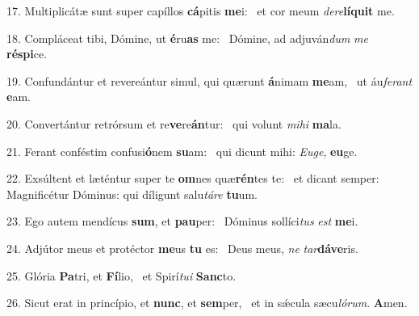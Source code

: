 17. Multiplicátæ sunt super capíllos \textbf{cá}pitis \textbf{me}i: \ast\  et cor meum \textit{de}\textit{re}\textbf{lí}\textbf{quit} me.\

18. Compláceat tibi, Dómine, ut \textbf{é}ru\textbf{as} me: \ast\  Dómine, ad adjuván\textit{dum} \textit{me} \textbf{ré}\textbf{spi}ce.\

19. Confundántur et revereántur simul, qui quærunt \textbf{á}nimam \textbf{me}am, \ast\  ut áu\textit{fe}\textit{rant} \textbf{e}am.\

20. Convertántur retrórsum et re\textbf{ve}re\textbf{án}tur: \ast\  qui volunt \textit{mi}\textit{hi} \textbf{ma}la.\

21. Ferant conféstim confusi\textbf{ó}nem \textbf{su}am: \ast\  qui dicunt mihi: \textit{Eu}\textit{ge}, \textbf{eu}ge.\

22. Exsúltent et læténtur super te \textbf{om}nes quæ\textbf{rén}tes te: \ast\  et dicant semper: Magnificétur Dóminus: qui díligunt salu\textit{tá}\textit{re} \textbf{tu}um.\

23. Ego autem mendícus \textbf{sum}, et \textbf{pau}per: \ast\  Dóminus sollíci\textit{tus} \textit{est} \textbf{me}i.\

24. Adjútor meus et protéctor \textbf{me}us \textbf{tu} es: \ast\  Deus meus, \textit{ne} \textit{tar}\textbf{dá}\textbf{ve}ris.\

25. Glória \textbf{Pa}tri, et \textbf{Fí}lio, \ast\  et Spirí\textit{tu}\textit{i} \textbf{Sanc}to.\

26. Sicut erat in princípio, et \textbf{nunc}, et \textbf{sem}per, \ast\  et in sǽcula sæcu\textit{ló}\textit{rum}. \textbf{A}men.\

